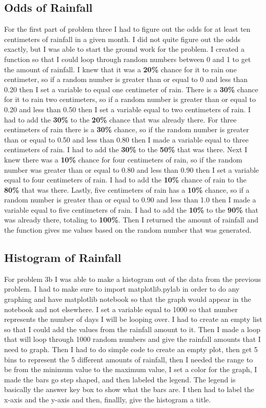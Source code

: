 \documentclass[twocolumn]{revtex4}
\begin{document}
\subsection{\bf Odds of Rainfall}

For the first part of problem three I had to figure out the odds for at least ten centimeters of rainfall in a given month. I did not quite figure out the odds exactly, but I was able to start the ground work for the problem. I created a function so that I could loop through random numbers between 0 and 1 to get the amount of rainfall. I knew that it was a {\bf 20\%} chance for it to rain one centimeter, so if a random number is greater than or equal to 0 and less than 0.20 then I set a variable to equal one centimeter of rain. There is a {\bf 30\%} chance for it to rain two centimeters, so if a random number is greater than or equal to 0.20 and less than 0.50 then I set a variable equal to two centimeters of rain. I had to add the {\bf 30\%} to the {\bf 20\%} chance that was already there. For three centimeters of rain there is a {\bf 30\%} chance, so if the random number is greater than or equal to 0.50 and less than 0.80 then I made a variable equal to three centimeters of rain. I had to add the {\bf 30\%} to the {\bf 50\%} that was there. Next I knew there was a {\bf 10\%} chance for four centimeters of rain, so if the random number was greater than or equal to 0.80 and less than 0.90 then I set a variable equal to four centimeters of rain. I had to add the {\bf 10\%} chance of rain to the {\bf 80\%} that was there. Lastly, five centimeters of rain has a {\bf 10\%} chance, so if a random number is greater than or equal to 0.90 and less than 1.0 then I made a variable equal to five centimeters of rain. I had to add the {\bf 10\%} to the {\bf 90\%} that was already there, totaling to {\bf 100\%}. Then I returned the amount of rainfall and the function gives me values based on the random number that was generated.  

\subsection{\bf Histogram of Rainfall}

For problem 3b I was able to make a histogram out of the data from the previous problem. I had to make sure to import matplotlib.pylab in order to do any graphing and have matplotlib notebook so that the graph would appear in the notebook and not elsewhere. I set a variable equal to 1000 so that number represents the number of days I will be looping over. I had to create an empty list so that I could add the values from the rainfall amount to it. Then I made a loop that will loop through 1000 random numbers and give the rainfall amounts that I need to graph. Then I had to do simple code to create an empty plot, then get 5 bins to represent the 5 different amounts of rainfall, then I needed the range to be from the minimum value to the maximum value, I set a color for the graph, I made the bars go step shaped, and then labeled the legend. The legend is basically the answer key box to show what the bars are. I then had to label the x-axis and the y-axis and then, finallly, give the histogram a title. 
\end{document}
